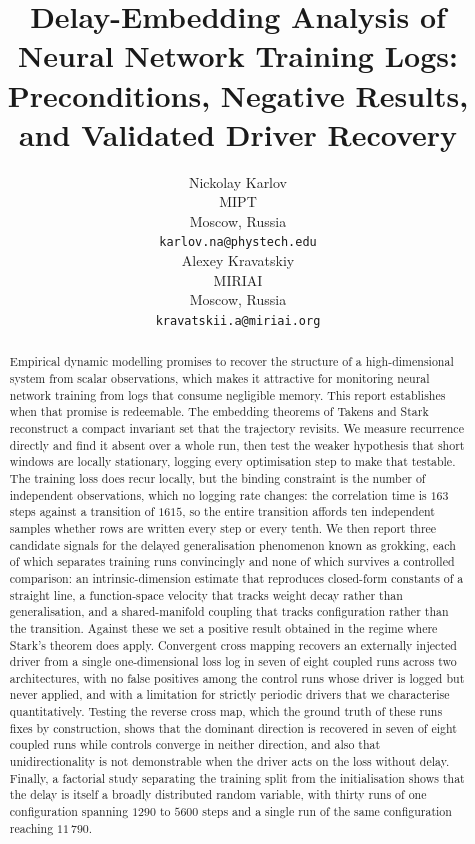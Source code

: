 \documentclass{article}
\title{Delay-Embedding Analysis of Neural Network Training Logs:\\
Preconditions, Negative Results, and Validated Driver Recovery}
\author{
  Nickolay Karlov\\
  MIPT\\
  Moscow, Russia\\
  \texttt{karlov.na@phystech.edu}\\
  \And
  Alexey Kravatskiy\\
  MIRIAI\\
  Moscow, Russia\\
  \texttt{kravatskii.a@miriai.org}\\
}
\begin{document}
\maketitle

\begin{abstract}
Empirical dynamic modelling promises to recover the structure of a high-dimensional
system from scalar observations, which makes it attractive for monitoring neural network
training from logs that consume negligible memory. This report establishes when that
promise is redeemable. The embedding theorems of Takens and Stark reconstruct a compact
invariant set that the trajectory revisits. We measure recurrence directly and find it
absent over a whole run, then test the weaker hypothesis that short windows are locally
stationary, logging every optimisation step to make that testable. The training loss does
recur locally, but the binding constraint is the number of independent observations, which
no logging rate changes: the correlation time is $163$ steps against a transition of
$1615$, so the entire transition affords ten independent samples whether rows are written
every step or every tenth. We then
report three candidate signals for the delayed generalisation phenomenon known as
grokking, each of which separates training runs convincingly and none of which survives a
controlled comparison: an intrinsic-dimension estimate that reproduces closed-form
constants of a straight line, a function-space velocity that tracks weight decay rather
than generalisation, and a shared-manifold coupling that tracks configuration rather than
the transition. Against these we set a positive result obtained in the regime where
Stark's theorem does apply. Convergent cross mapping recovers an externally injected
driver from a single one-dimensional loss log in seven of eight coupled runs across two
architectures, with no false positives among the control runs whose driver is logged but
never applied, and with a limitation for strictly periodic drivers that we characterise
quantitatively. Testing the reverse cross map, which the ground truth of these runs fixes
by construction, shows that the dominant direction is recovered in seven of eight coupled
runs while controls converge in neither direction, and also that unidirectionality is not
demonstrable when the driver acts on the loss without delay. Finally, a factorial study
separating the training split from the initialisation shows that the delay is itself a
broadly distributed random variable, with thirty runs of one configuration spanning $1290$
to $5600$ steps and a single run of the same configuration reaching $11\,790$.
\end{abstract}
\end{document}
